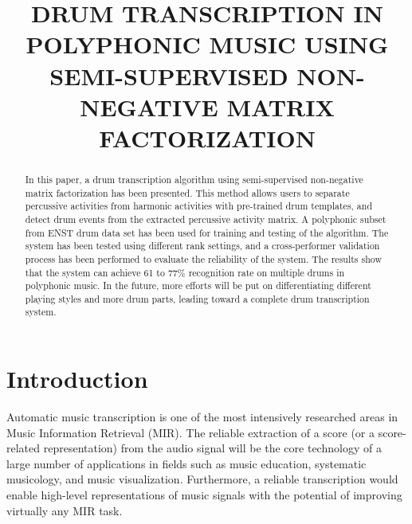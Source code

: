 \documentclass{article}
\title{DRUM TRANSCRIPTION IN POLYPHONIC MUSIC USING SEMI-SUPERVISED NON-NEGATIVE MATRIX FACTORIZATION}
\begin{document}
%
\maketitle
%
\begin{abstract}
In this paper, a drum transcription algorithm using semi-supervised non-negative matrix factorization has been presented. This method allows users to separate percussive activities from harmonic activities with pre-trained drum templates, and detect drum events from the extracted percussive activity matrix. A polyphonic subset from ENST drum data set has been used for training and testing of the algorithm. The system has been tested using different rank settings, and a cross-performer validation process has been performed to evaluate the reliability of the system.  The results show that the system can achieve 61 to 77\% recognition rate on multiple drums in polyphonic music. In the future, more efforts will be put on differentiating different playing styles and more drum parts, leading toward a complete drum transcription system.

\end{abstract}
%

\section{Introduction}\label{sec:introduction}
Automatic music transcription is one of the most intensively researched areas in Music Information Retrieval (MIR). The reliable extraction of a score (or a score-related representation) from the audio signal will be the core technology of a large number of applications in fields such as music education, systematic musicology, and music visualization. Furthermore, a reliable transcription would enable high-level representations of music signals with the potential of improving virtually any MIR task.

\end{document}
